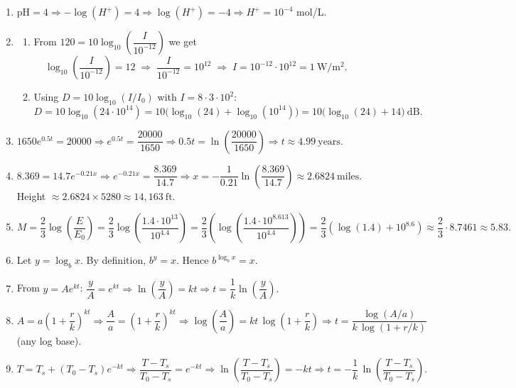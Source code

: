 \documentclass{article}
\begin{document}
\begin{enumerate}[label=\textbf{\arabic*.}, leftmargin=*, itemsep=0.45em]

\item \(\mathrm{pH}=4\Rightarrow -\log(H^+)=4\Rightarrow \log(H^+)=-4\Rightarrow H^+=10^{-4}\) mol/L.

\item 
\begin{enumerate}[label=(\alph*)]
  \item From \(120 = 10\log_{10}\!\left(\dfrac{I}{10^{-12}}\right)\) we get
  \[
  \log_{10}\!\left(\frac{I}{10^{-12}}\right)=12
  \;\Longrightarrow\;
  \frac{I}{10^{-12}}=10^{12}
  \;\Longrightarrow\;
  I = 10^{-12}\cdot 10^{12}=1\ \mathrm{W/m^2}.
  \]
  \item Using \(D=10\log_{10}(I/I_0)\) with \(I=8\cdot 3\cdot 10^{2}\):
  \[
  D
  =10\log_{10}(24\cdot 10^{14})
  =10\big(\log_{10}(24)+\log_{10}(10^{14})\big)
  = 10\big(\log_{10}(24) + 14\big)\ \text{dB}.
  \]
\end{enumerate}

\item \(1650e^{0.5t}=20000\Rightarrow e^{0.5t}=\dfrac{20000}{1650}\Rightarrow
0.5t=\ln\!\left(\dfrac{20000}{1650}\right)\Rightarrow t\approx 4.99\ \text{years}.\)

\item \(8.369=14.7e^{-0.21x}\Rightarrow e^{-0.21x}=\dfrac{8.369}{14.7}\Rightarrow
x=-\dfrac{1}{0.21}\ln\!\left(\dfrac{8.369}{14.7}\right)\approx 2.6824\ \text{miles}.\)
Height \(\approx 2.6824\times 5280\approx 14{,}163\ \text{ft}.\)

\item \(M=\dfrac{2}{3}\log\!\left(\dfrac{E}{E_0}\right)
=\dfrac{2}{3}\log\!\left(\dfrac{1.4\cdot 10^{13}}{10^{4.4}}\right)
=\dfrac{2}{3}\left(\log\!\left(\dfrac{1.4\cdot 10^{8.613}}{10^{4.4}}\right)\right)
= \dfrac{2}{3}\left(\log\!\left(1.4\right) + 10^{8.6}\right)
\approx \dfrac{2}{3}\cdot 8.7461\approx 5.83.\)

\item Let \(y=\log_b x\). By definition, \(b^y=x\). Hence \(b^{\log_b x}=x\).

\item From \(y=Ae^{kt}\): \(\dfrac{y}{A}=e^{kt}\Rightarrow \ln\!\left(\dfrac{y}{A}\right)=kt\Rightarrow
t=\dfrac{1}{k}\ln\!\left(\dfrac{y}{A}\right).\)

\item \(A=a\!\left(1+\dfrac{r}{k}\right)^{kt}\Rightarrow \dfrac{A}{a}=\!\left(1+\dfrac{r}{k}\right)^{kt}\Rightarrow
\log\!\left(\dfrac{A}{a}\right)=kt\,\log\!\left(1+\dfrac{r}{k}\right)\Rightarrow
t=\dfrac{\log(A/a)}{k\,\log(1+r/k)}\) (any log base).

\item \(T=T_s+(T_0-T_s)e^{-kt}\Rightarrow \dfrac{T-T_s}{T_0-T_s}=e^{-kt}\Rightarrow
\ln\!\left(\dfrac{T-T_s}{T_0-T_s}\right)=-kt\Rightarrow
t=-\dfrac{1}{k}\,\ln\!\left(\dfrac{T-T_s}{T_0-T_s}\right).\)

\end{enumerate}
\end{document}
